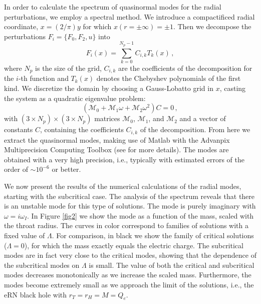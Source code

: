 \documentclass[floats,floatfix,showpacs,amssymb,prd,superscriptaddress,nofootinbib,nolongbibliography,reprint]{revtex4-2}
\newcommand\prlsec[1]{\vspace{2mm}\noindent {\textbf{  \textit{#1}}}}
\begin{document}
\prlsec{Spectral method.}


In order to calculate the spectrum of quasinormal modes for the radial perturbations, we employ a spectral method. 
We introduce a compactificed radial coordinate, $x= (2/\pi) y$ for which $x(r=\pm\infty)=\pm1$.
%
Then we decompose the perturbations 
$F_i=\{F_0,F_2,u\}$
into 
%
\begin{equation}\label{spectral_decomp}
    F_i(x)=\sum_{k=0}^{N_p-1}C_{i,k}T_k(x) \, ,
\end{equation}
where $N_p$ is the size of the grid, 
$C_{i,k}$ are the coefficients of the decomposition for the $i$-th function and $T_k(x)$ denotes the Chebyshev polynomials of the first kind.
We discretize the domain by choosing a Gauss-Lobatto grid in $x$, casting the system as a quadratic eigenvalue problem:
\begin{equation}
    \left(\mathcal{M}_0+\mathcal{M}_1\omega+\mathcal{M}_2\omega^2\right)C=0 \, ,
\end{equation}
with $(3\times N_p) \times (3\times N_p)$ matrices $\mathcal{M}_0$, $\mathcal{M}_1$, and $\mathcal{M}_2$
and a vector of constants $C$, containing the coefficients $C_{i,k}$ of the decomposition.
From here we extract the quasinormal modes, making use of
Matlab with the Advanpix Multiprecision Computing Toolbox \cite{Advanpix} (see \cite{Blazquez-Salcedo:2023hwg,Khoo:2024yeh,Blazquez-Salcedo:2024oek, 
Blazquez-Salcedo:2024dur} for more details). 
The modes are obtained with a very high precision, i.e., typically with estimated errors of the order of  $\sim 10^{-6}$ or better. 



\prlsec{Results.}
%
We now present the results of the numerical calculations of the radial modes, starting with the subcritical case. The analysis of the spectrum reveals that there is an unstable mode for this type of solutions. The mode is purely imaginary with $\omega=i\omega_I$. In Figure \ref{fig2} we show the mode as a function of the mass, scaled with the throat radius. The curves in color correspond to families of solutions with a fixed value of $\Lambda$.
%
For comparison,
in black we show the family of critical solutions ($\Lambda=0$), for which the mass exactly equals  the electric charge. The subcritical 
modes are in fact very close to the critical 
modes,
showing that the dependence of the {subcritical} modes on $\Lambda$ is small.
The value of both the critical and subcritical modes decreases monotonically as we increase 
the scaled mass. 
Furthermore, the modes become extremely small as we approach the limit of the solutions, i.e., the eRN black hole with $r_T=r_H=M=Q_e$. %
\end{document}
